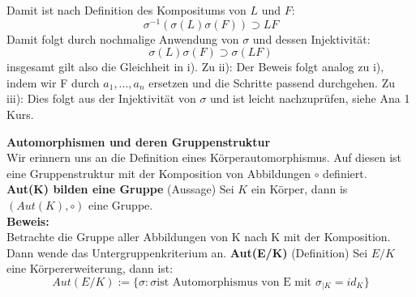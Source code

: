 \documentclass[a4paper, 10pt]{scrartcl}
\begin{document}
Damit ist nach Definition des Kompositums von $L$ und $F$: $$\sigma^{-1} (\sigma(L) \sigma(F)) \supset LF$$
Damit folgt durch nochmalige Anwendung von $\sigma$ und dessen Injektivität: $$\sigma(L) \sigma(F) \supset \sigma(LF)$$
insgesamt gilt also die Gleichheit in i).\newline
\newline
Zu ii): Der Beweis folgt analog zu i), indem wir F durch $a_1, ...,a_n$ ersetzen und die Schritte passend durchgehen. \newline
\newline
Zu iii): Dies folgt aus der Injektivität von $\sigma$ und ist leicht nachzuprüfen, siehe Ana 1 Kurs.


\textbf{Automorphismen und deren Gruppenstruktur}\\
Wir erinnern uns an die Definition eines Körperautomorphismus. Auf diesen ist eine Gruppenstruktur mit der Komposition von Abbildungen $\circ$ definiert.\\
\textbf{Aut(K) bilden eine Gruppe} (Aussage)\newline
Sei $K$ ein Körper, dann is $(Aut(K), \circ)$ eine Gruppe.\\
\textbf{Beweis:}\\
Betrachte die Gruppe aller Abbildungen von K nach K mit der Komposition. Dann wende das Untergruppenkriterium an.
\newline
\newline
\textbf{Aut(E/K)} (Definition) \newline
Sei $E/K$ eine Körpererweiterung, dann ist: $$Aut(E/K) := \{\sigma : \sigma \text{ist Automorphismus von E mit } \sigma_{|K}=id_K \}$$
\end{document}
